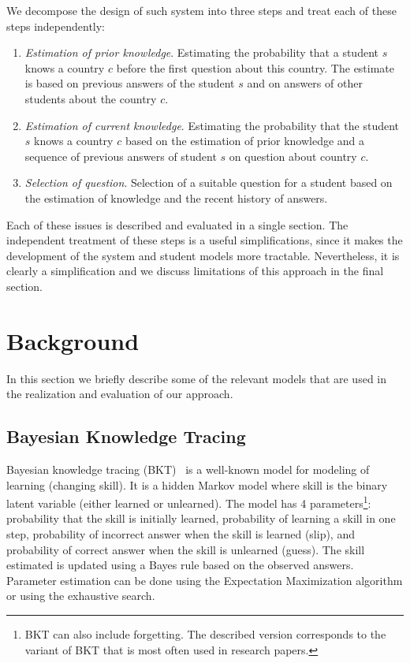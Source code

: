 \documentclass{edm_template}
\begin{document}
We decompose the design of such system into three steps and treat each of these
steps independently:
\begin{enumerate}
\item \emph{Estimation of prior knowledge}. Estimating the probability that a
  student $s$ knows a country $c$ before the first question about this country.
  The estimate is based on previous answers of the student $s$ and on answers
  of other students about the country $c$.
\item \emph{Estimation of current knowledge}. Estimating the probability that
  the student $s$ knows a country $c$ based on the estimation of prior
  knowledge and a sequence of previous answers of student $s$ on question about
  country $c$.
\item \emph{Selection of question}. Selection of a suitable question for a student
  based on the estimation of knowledge and the recent history of answers.
\end{enumerate}
Each of these issues is described and evaluated in a single section. The
independent treatment of these steps is a useful simplifications, since it
makes the development of the system and student models more tractable.
Nevertheless, it is clearly a simplification and we discuss limitations of this
approach in the final section.



\section{Background}

In this section we briefly describe some of the relevant models that are used
in the realization and evaluation of our approach.

\subsection{Bayesian Knowledge Tracing}

Bayesian knowledge tracing (BKT)~\cite{corbett1994knowledge,van2013properties}
is a well-known model for modeling of learning (changing skill). It is a hidden
Markov model where skill is the binary latent variable (either learned or
unlearned). The model has 4 parameters\footnote{BKT can also include
  forgetting. The described version corresponds to the variant of BKT that is
  most often used in research papers.}: probability that the skill is initially
learned, probability of learning a skill in one step, probability of incorrect
answer when the skill is learned (slip), and probability of correct answer when
the skill is unlearned (guess). The skill estimated is updated using a Bayes
rule based on the observed answers. Parameter estimation can be done using
the Expectation Maximization algorithm or using the exhaustive search.
\end{document}
